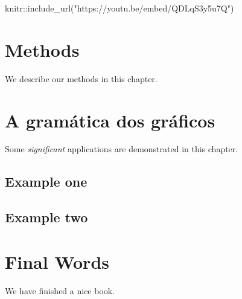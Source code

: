\documentclass[
  brazilian,
]{book}
\newenvironment{Shaded}{\begin{snugshade}}{\end{snugshade}}
\newcommand{\FunctionTok}[1]{\textcolor[rgb]{0.00,0.00,0.00}{#1}}
\newcommand{\NormalTok}[1]{#1}
\newcommand{\SpecialCharTok}[1]{\textcolor[rgb]{0.00,0.00,0.00}{#1}}
\newcommand{\StringTok}[1]{\textcolor[rgb]{0.31,0.60,0.02}{#1}}
\begin{document}
\begin{Shaded}
\begin{Highlighting}[]
\NormalTok{knitr}\SpecialCharTok{::}\FunctionTok{include\_url}\NormalTok{(}\StringTok{"https://youtu.be/embed/QDLqS3y5u7Q"}\NormalTok{)}
\end{Highlighting}
\end{Shaded}

\hypertarget{methods}{%
\chapter{Methods}\label{methods}}

We describe our methods in this chapter.

\hypertarget{a-gramuxe1tica-dos-gruxe1ficos}{%
\chapter{A gramática dos gráficos}\label{a-gramuxe1tica-dos-gruxe1ficos}}

Some \emph{significant} applications are demonstrated in this chapter.

\hypertarget{example-one}{%
\section{Example one}\label{example-one}}

\hypertarget{example-two}{%
\section{Example two}\label{example-two}}

\hypertarget{final-words}{%
\chapter{Final Words}\label{final-words}}

We have finished a nice book.

\renewcommand{\bibname}{Referências}

  
\end{document}
